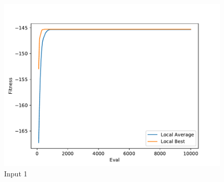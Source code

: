 \documentclass{standalone}
\begin{document}
\begin{figure}[!htb]
	\caption{Input 1}
	\label{fig:graph_1045}
	\includegraphics[width=\textwidth]{../graphs/graphs/1045.pdf}
\end{figure}
\end{document}
